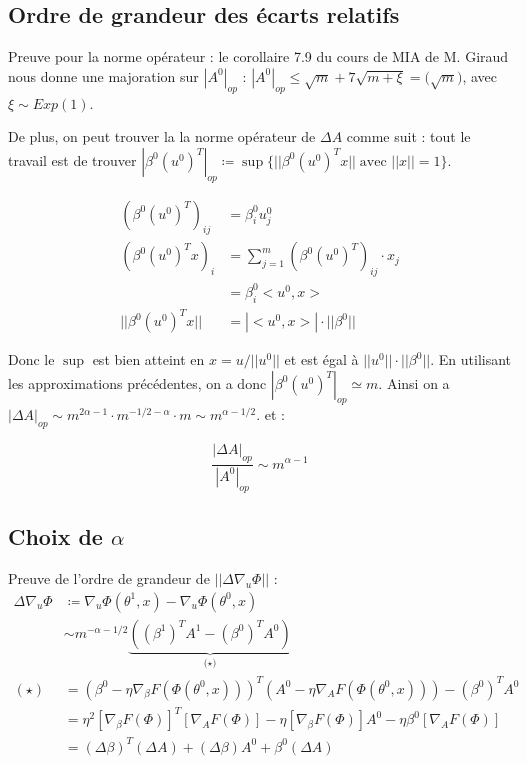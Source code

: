 \documentclass[a4paper, 11pt, french]{article}
\theoremstyle{definition}
\begin{document}
\subsection{Ordre de grandeur des écarts relatifs}

Preuve pour la norme opérateur : le corollaire 7.9 du cours de MIA de M. Giraud \cite{mia} nous donne une majoration sur $|A^0|_{op}$ : $|A^0|_{op} \leq \sqrt{m} + 7\sqrt{m + \xi} = \mathcal( \sqrt{m})$, avec $\xi \sim Exp(1)$.

De plus, on peut trouver la la norme opérateur de $\Delta A$ comme suit : tout le travail est de trouver $|\beta^0 (u^0)^T|_{op} \coloneqq \sup \{||\beta^0 (u^0)^T x|| \; 
\text{avec }||x|| = 1\}$.

\begin{align}
	(\beta^0 (u^0)^T)_{ij} &= \beta^0_i u^0_j \\
	(\beta^0 (u^0)^T x)_i &= \sum_{j=1}^{m} (\beta^0 (u^0)^T)_{ij} \cdot x_j \\
	&= \beta^0_i < u^0, x> \\
	||\beta^0 (u^0)^T x|| &= |< u^0, x>| \cdot ||\beta^0||
\end{align}

Donc le $\sup$ est bien atteint en $x = u / ||u^0||$ et est égal à $||u^0|| \cdot ||\beta^0||$. En utilisant les approximations précédentes, on a donc $|\beta^0 (u^0)^T|_{op} \simeq m$. Ainsi on a $|\Delta A|_{op} \sim m^{2\alpha - 1} \cdot m^{-1/2 - \alpha} \cdot m \sim m^{\alpha - 1/2}.$ et :

\[\frac{|\Delta A|_{op}}{|A^0|_{op}} \sim m^{\alpha - 1}\]

\subsection{Choix de $\alpha$}

Preuve de l'ordre de grandeur de $||\Delta \nabla_u \Phi||$ :
\begin{align}
	\Delta \nabla_u \Phi &\coloneqq \nabla_u \Phi (\theta^1, x) -  \nabla_u \Phi (\theta^0, x) \\
	&\sim m^{-\alpha - 1/2} \underbrace{((\beta^1)^T A^1 - (\beta^0)^T A^0)}_\text{($\star$)} \\
	(\star) &= (\beta^0 - \eta \nabla_{\beta} F(\Phi(\theta^0, x)))^T (A^0 - \eta \nabla_{A} F(\Phi(\theta^0, x))) - (\beta^0)^T A^0 \\
	&= \eta^2 [\nabla_{\beta} F(\Phi)]^T[\nabla_{A} F(\Phi)] - \eta [\nabla_{\beta} F(\Phi)] A^0 - \eta \beta^0 [\nabla_{A} F(\Phi)] \\
	&= (\Delta \beta)^T(\Delta A) + (\Delta \beta) A^0 + \beta^0 (\Delta A)
\end{align}
\end{document}
